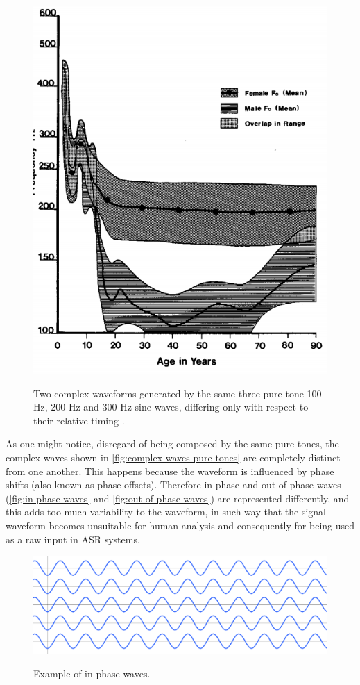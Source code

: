 \begin{figure}[!h]
        \myfloatalign
        {\includegraphics[width=.66\linewidth]{gfx/f0-age-sex.png}}
        \caption{Two complex waveforms generated by the same three pure tone 100 Hz, 200 Hz and 300 Hz sine waves, differing only 
        with respect to their relative timing \cite{Ladefoged1996}.}
        \label{fig:complex-waves-pure-tones}
\end{figure}
 
As one might notice, disregard of being composed by the same pure tones, the complex waves shown in 
\autoref{fig:complex-waves-pure-tones} are completely distinct from one another. This happens because the waveform is influenced
by phase shifts (also known as phase offsets). Therefore in-phase and out-of-phase waves (\autoref{fig:in-phase-waves} and
\autoref{fig:out-of-phase-waves}) are represented differently, and this adds too much variability to the waveform, in such way that
the signal waveform becomes unsuitable for human analysis and consequently for being used as a raw input in \ac{ASR} systems. 


\begin{figure}[!h]
        \myfloatalign
        {\includegraphics[width=.66\linewidth]{gfx/in-phase-waves.png}}
        \caption{Example of in-phase waves.}
        \label{fig:in-phase-waves}
\end{figure}


